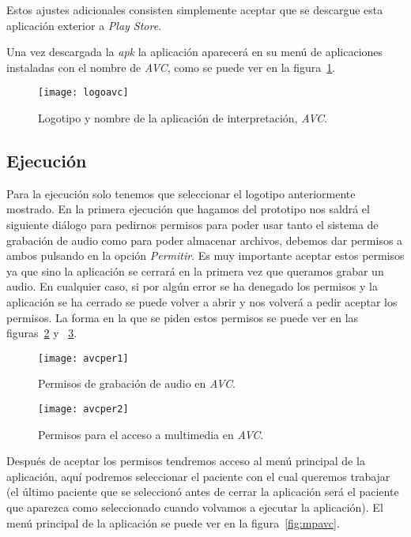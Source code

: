 Estos ajustes adicionales consisten simplemente aceptar que se descargue esta aplicación exterior a \textit{Play Store}.

Una vez descargada la \textit{apk} la aplicación aparecerá en su menú de aplicaciones instaladas con el nombre de \textit{AVC}, como se puede ver en la figura~\ref{fig:logoavc}.

\begin{figure}[htp]
	\centering
	\texttt{[image: logoavc]}
	\caption{Logotipo y nombre de la aplicación de interpretación, \textit{AVC}.}
	\label{fig:logoavc}
\end{figure}

\subsection{Ejecución}
Para la ejecución solo tenemos que seleccionar el logotipo anteriormente mostrado. En la primera ejecución que hagamos del prototipo nos saldrá el siguiente diálogo para pedirnos permisos para poder usar tanto el sistema de grabación de audio como para poder almacenar archivos, debemos dar permisos a ambos pulsando en la opción \textit{Permitir}. Es muy importante aceptar estos permisos ya que sino la aplicación se cerrará en la primera vez que queramos grabar un audio. En cualquier caso, si por algún error se ha denegado los permisos y la aplicación se ha cerrado se puede volver a abrir y nos volverá a pedir aceptar los permisos. La forma en la que se piden estos permisos se puede ver en las figuras~\ref{fig:avcper1} y ~\ref{fig:avcper2}.

\begin{figure}[htp]
	\centering
	\texttt{[image: avcper1]}
	\caption{Permisos de grabación de audio en \textit{AVC}.}
	\label{fig:avcper1}
\end{figure}

\begin{figure}[htp]
	\centering
	\texttt{[image: avcper2]}
	\caption{Permisos para el acceso a multimedia en \textit{AVC}.}
	\label{fig:avcper2}
\end{figure}

Después de aceptar los permisos tendremos acceso al menú principal de la aplicación, aquí podremos seleccionar el paciente con el cual queremos trabajar (el último paciente que se seleccionó antes de cerrar la aplicación será el paciente que aparezca como seleccionado cuando volvamos a ejecutar la aplicación). El menú principal de la aplicación se puede ver en la figura~\ref{fig:mpavc}.


